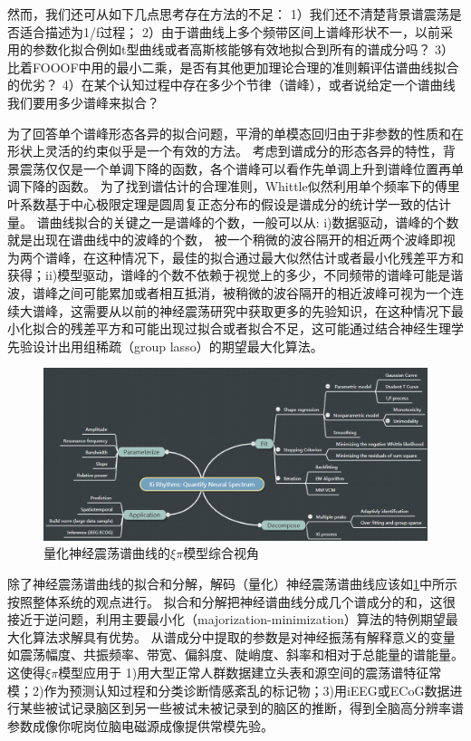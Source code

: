 然而，我们还可从如下几点思考存在方法的不足：
1）我们还不清楚背景谱震荡是否适合描述为1/f过程； 2）由于谱曲线上多个频带区间上谱峰形状不一，以前采用的参数化拟合例如t型曲线或者高斯核能够有效地拟合到所有的谱成分吗？ 3）比着FOOOF中用的最小二乘，是否有其他更加理论合理的准则賴评估谱曲线拟合的优劣？
4）在某个认知过程中存在多少个节律（谱峰），或者说给定一个谱曲线我们要用多少谱峰来拟合？

为了回答单个谱峰形态各异的拟合问题，平滑的单模态回归由于非参数的性质和在形状上灵活的约束似乎是一个有效的方法。 考虑到谱成分的形态各异的特性，背景震荡仅仅是一个单调下降的函数，各个谱峰可以看作先单调上升到谱峰位置再单调下降的函数。 为了找到谱估计的合理准则，Whittle似然利用单个频率下的傅里叶系数基于中心极限定理是圆周复正态分布的假设是谱成分的统计学一致的估计量。 谱曲线拟合的关键之一是谱峰的个数，一般可以从: i)数据驱动，谱峰的个数就是出现在谱曲线中的波峰的个数， 被一个稍微的波谷隔开的相近两个波峰即视为两个谱峰，在这种情况下，最佳的拟合通过最大似然估计或者最小化残差平方和获得；ii)模型驱动，谱峰的个数不依赖于视觉上的多少，不同频带的谱峰可能是谐波，谱峰之间可能累加或者相互抵消，被稍微的波谷隔开的相近波峰可视为一个连续大谱峰，这需要从以前的神经震荡研究中获取更多的先验知识，在这种情况下最小化拟合的残差平方和可能出现过拟合或者拟合不足，这可能通过结合神经生理学先验设计出用组稀疏（group lasso）的期望最大化算法。

\begin{figure}[!ht]
\includegraphics[width=15cm]{pic/xipi/figure1.png}
\caption{量化神经震荡谱曲线的$\xi\pi$模型综合视角}
\label{fig1}
\end{figure}

除了神经震荡谱曲线的拟合和分解，解码（量化）神经震荡谱曲线应该如\ref{fig1}中所示按照整体系统的观点进行。 拟合和分解把神经谱曲线分成几个谱成分的和，这很接近于逆问题，利用主要最小化（majorization-minimization）算法的特例期望最大化算法求解具有优势。 从谱成分中提取的参数是对神经振荡有解释意义的变量如震荡幅度、共振频率、带宽、偏斜度、陡峭度、斜率和相对于总能量的谱能量。 这使得$\xi\pi$模型应用于 1)用大型正常人群数据建立头表和源空间的震荡谱特征常模；2)作为预测认知过程和分类诊断情感紊乱的标记物；3)用iEEG或ECoG数据进行某些被试记录脑区到另一些被试未被记录到的脑区的推断，得到全脑高分辨率谱参数成像你呢岗位脑电磁源成像提供常模先验。

